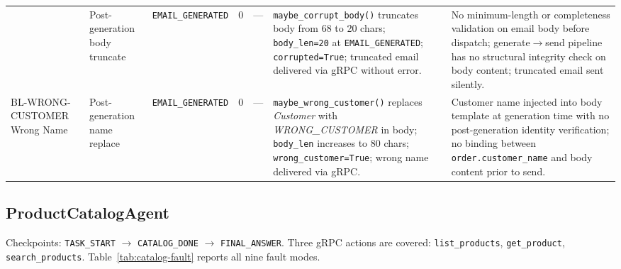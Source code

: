 \documentclass[conference]{IEEEtran}
\begin{document}
\begin{table}[!t]
\begin{tabularx}{\textwidth}{J{1.4cm}J{1.9cm}J{1.7cm}cJ{1.4cm}KK}
  & Post-generation body truncate
  & \texttt{EMAIL\_GENERATED}  & 0  & ---
  & \texttt{maybe\_corrupt\_body()} truncates body from 68 to 20 chars;
    \texttt{body\_len=20} at \texttt{EMAIL\_GENERATED};
    \texttt{corrupted=True}; truncated email delivered via gRPC without error.
  & No minimum-length or completeness validation on email body before dispatch;
    generate$\to$send pipeline has no structural integrity check on body
    content; truncated email sent silently. \\
BL-WRONG-CUSTOMER Wrong Name
  & Post-generation name replace
  & \texttt{EMAIL\_GENERATED}  & 0  & ---
  & \texttt{maybe\_wrong\_customer()} replaces \emph{Customer} with
    \emph{WRONG\_CUSTOMER} in body; \texttt{body\_len} increases to 80 chars;
    \texttt{wrong\_customer=True}; wrong name delivered via gRPC.
  & Customer name injected into body template at generation time with no
    post-generation identity verification; no binding between
    \texttt{order.customer\_name} and body content prior to send. \\
\bottomrule
\end{tabularx}
\end{table}

\subsection{ProductCatalogAgent}

Checkpoints: \texttt{TASK\_START} $\to$ \texttt{CATALOG\_DONE} $\to$
\texttt{FINAL\_ANSWER}. Three gRPC actions are covered:
\texttt{list\_products}, \texttt{get\_product}, \texttt{search\_products}.
Table~\ref{tab:catalog-fault} reports all nine fault modes.
\end{document}
